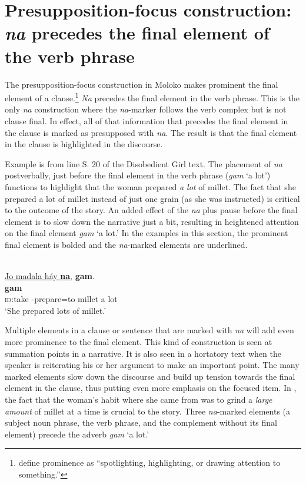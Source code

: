 \section{Presupposition-focus construction: \textit{na} precedes the final element of the verb phrase}\label{sec:11.5}
\hypertarget{RefHeading1213301525720847}{}
The presupposition-focus construction in Moloko makes prominent the final element of a clause.\footnote{\citet[221]{LongacreHwang2012} define prominence as “spotlighting, highlighting, or drawing attention to something.”} \textit{Na} precedes the final element in the verb phrase. This is the only \textit{na} construction where the \textit{na}{}-marker follows the verb complex but is not clause final. In effect, all of that information that precedes the final element in the clause is marked as presupposed with \textit{na}. The result is that the final element in the clause is highlighted in the discourse.

Example  is from line S. 20 of the Disobedient Girl text. The placement of \textit{na} postverbally, just before the final element in the verb phrase (\textit{gam} ‘a lot’) functions to highlight that the woman prepared \textit{a lot} of millet. The fact that she prepared a lot of millet instead of just one grain (as she was instructed) is critical to the outcome of the story. An added effect of the \textit{na} plus pause before the final element is to slow down the narrative just a bit, resulting in heightened attention on the final element \textit{gam} ‘a lot.’ In the examples in this section, the prominent final element is bolded and the \textit{na}-marked elements are underlined.

\ea \label{ex:11:45}\\
\underline{Jo  madala  háy  \textbf{na}},  \textbf{gam}.\\
\gll  {}       \textbf{gam}\\
      \textsc{id}:take  {\NOM}-prepare=to  millet  {\PSP} {a lot}\\
\glt  ‘She prepared lots of millet.'
\z

Multiple elements in a clause or sentence that are marked with \textit{na} will add even more prominence to the final element. This kind of construction is seen at summation points in a narrative. It is also seen in a hortatory text when the speaker is reiterating his or her argument to make an important point. The many marked elements slow down the discourse and build up tension towards the final element in the clause, thus putting even more emphasis on the focused item. In , the fact that the woman’s habit where she came from was to grind a \textit{large amount} of millet at a time is crucial to the story. Three \textit{na}-marked elements (a subject noun phrase, the verb phrase, and the complement without its final element) precede the adverb \textit{gam} ‘a lot.’


